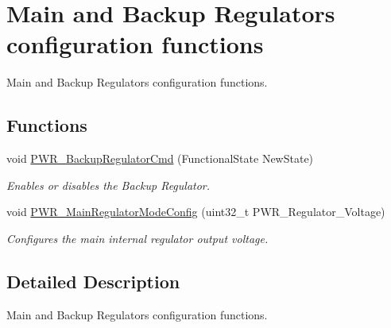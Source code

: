 \hypertarget{group___p_w_r___group4}{}\section{Main and Backup Regulators configuration functions}
\label{group___p_w_r___group4}


Main and Backup Regulators configuration functions.  


\subsection*{Functions}
\begin{DoxyCompactItemize}
\item 
void \hyperlink{group___p_w_r___group4_ga83a4d6c5b048f2dab18e8fb04f5368d7}{P\+W\+R\+\_\+\+Backup\+Regulator\+Cmd} (Functional\+State New\+State)
\begin{DoxyCompactList}\small\item\em Enables or disables the Backup Regulator. \end{DoxyCompactList}\item 
void \hyperlink{group___p_w_r___group4_gada193dea79762f379d4e666a98f28d89}{P\+W\+R\+\_\+\+Main\+Regulator\+Mode\+Config} (uint32\+\_\+t P\+W\+R\+\_\+\+Regulator\+\_\+\+Voltage)
\begin{DoxyCompactList}\small\item\em Configures the main internal regulator output voltage. \end{DoxyCompactList}\end{DoxyCompactItemize}


\subsection{Detailed Description}
Main and Backup Regulators configuration functions. 

